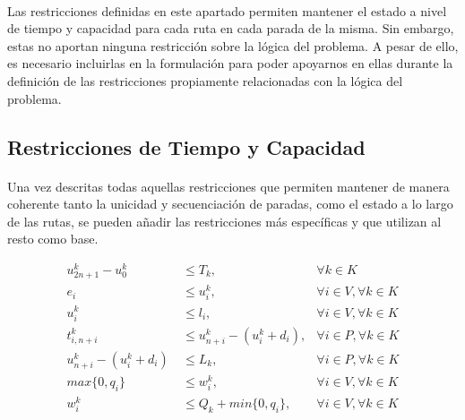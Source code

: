 \documentclass{subfiles}
\begin{document}
        \paragraph{}
        Las restricciones definidas en este apartado permiten mantener el estado a nivel de tiempo y capacidad para cada ruta en cada parada de la misma. Sin embargo, estas no aportan ninguna restricción sobre la lógica del problema. A pesar de ello, es necesario incluirlas en la formulación para poder apoyarnos en ellas durante la definición de las restricciones propiamente relacionadas con la lógica del problema.

      \subsection{Restricciones de Tiempo y Capacidad}
      \label{sec:formulation_basic_darp_time_capacity}

        \paragraph{}
        Una vez descritas todas aquellas restricciones que permiten mantener de manera coherente tanto la unicidad y secuenciación de paradas, como el estado a lo largo de las rutas, se pueden añadir las restricciones más específicas y que utilizan al resto como base.

        \begin{align}
        \label{eq:formulation_basic_darp_time_capacity_1}
          u_{2n+1}^{k} - u_{0}^{k} \ &\leq T_{k}, & \forall k \in K \\
        \label{eq:formulation_basic_darp_time_capacity_2}
          e_{i} \ &\leq u_{i}^{k}, & \forall i \in V, \forall k \in K \\
        \label{eq:formulation_basic_darp_time_capacity_3}
          u_{i}^{k} \ &\leq l_{i}, & \forall i \in V, \forall k \in K \\
        \label{eq:formulation_basic_darp_time_capacity_4}
          t_{i, n + i}^{k} \ &\leq u_{n+i}^{k} - (u_{i}^{k} + d_{i}), & \forall i \in P, \forall k \in K \\
        \label{eq:formulation_basic_darp_time_capacity_5}
          u_{n+i}^{k} - (u_{i}^{k} + d_{i}) \ &\leq L_{k}, & \forall i \in P, \forall k \in K \\
        \label{eq:formulation_basic_darp_time_capacity_6}
          max\{0, q_{i}\} \ &\leq w_{i}^{k}, & \forall i \in V, \forall k \in K \\
        \label{eq:formulation_basic_darp_time_capacity_7}
          w_{i}^{k} \ &\leq Q_{k} + min\{0, q_{i}\}, & \forall i \in V, \forall k \in K
        \end{align}
\end{document}
